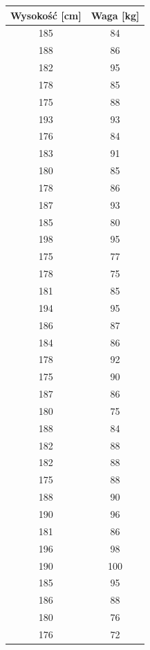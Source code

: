 \documentclass[12pt]{mwart}
\begin{document}
	\newpage
	\begin{table}[H]
	\begin{multicols}{2}
		\begin{table}[H]
			\centering
			\begin{tabular}{|c|c|}
				\hline
				\textbf{Wysokość [cm]} & \textbf{Waga [kg]} \\ \hline
				185 & 84 \\ \hline
				188 & 86 \\ \hline
				182 & 95 \\ \hline
				178 & 85 \\ \hline
				175 & 88 \\ \hline
				193 & 93 \\ \hline
				176 & 84 \\ \hline
				183 & 91 \\ \hline
				180 & 85 \\ \hline
				178 & 86 \\ \hline
				187 & 93 \\ \hline
				185 & 80 \\ \hline
				198 & 95 \\ \hline
				175 & 77 \\ \hline
				178 & 75 \\ \hline
				181 & 85 \\ \hline
				194 & 95 \\ \hline
				186 & 87 \\ \hline
				184 & 86 \\ \hline
				178 & 92 \\ \hline
				175 & 90 \\ \hline
				187 & 86 \\ \hline
				180 & 75 \\ \hline
				188 & 84 \\ \hline
				182 & 88 \\ \hline
				182 & 88 \\ \hline
				175 & 88 \\ \hline
				188 & 90 \\ \hline
				190 & 96 \\ \hline
				181 & 86 \\ \hline
				196 & 98 \\ \hline
				190 & 100 \\ \hline
				185 & 95 \\ \hline
				186 & 88 \\ \hline
				180 & 76 \\ \hline
				176 & 72 \\ \hline

\end{tabular}
\end{table}
\end{multicols}
\end{table}
\end{document}
